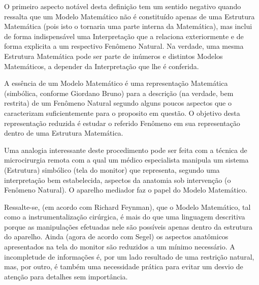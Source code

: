     O primeiro aspecto notável desta definição tem um sentido negativo quando ressalta que um Modelo Matemático não é constituído apenas de uma Estrutura Matemática (pois isto o tornaria uma parte interna da Matemática), mas inclui de forma indispensável uma Interpretação que a relaciona exteriormente e de forma explicita a um respectivo Fenômeno Natural. Na verdade, uma mesma Estrutura Matemática pode ser parte de inúmeros e distintos Modelos Matemáticos, a depender da Interpretação que lhe é conferida.
    
    A essência de um Modelo Matemático é uma representação Matemática (simbólica, conforme Giordano Bruno) para a descrição (na verdade, bem restrita) de um Fenômeno Natural segundo alguns poucos aspectos que o caracterizam suficientemente para o proposito em questão. O objetivo desta representação reduzida é estudar o referido Fenômeno em sua representação dentro de uma Estrutura Matemática.

    Uma analogia interessante deste procedimento pode ser feita com a técnica de microcirurgia remota com a qual um médico especialista manipula um sistema (Estrutura) simbólico (tela do monitor) que representa, segundo uma interpretação bem estabelecida, aspectos da anatomia sob intervenção (o Fenômeno Natural). O aparelho mediador faz o papel do Modelo Matemático.

    Ressalte-se, (em acordo com Richard Feynman), que o Modelo Matemático, tal como a instrumentalização cirúrgica, é mais do que uma linguagem descritiva porque as manipulações efetuadas nele são possíveis apenas dentro da estrutura do aparelho. Ainda (agora de acordo com Segel) os aspectos anatômicos apresentados na tela do monitor são reduzidos a um mínimo necessário. A incompletude de informações é, por um lado resultado de uma restrição natural, mas, por outro, é também uma necessidade prática para evitar um desvio de atenção para detalhes sem importância.

